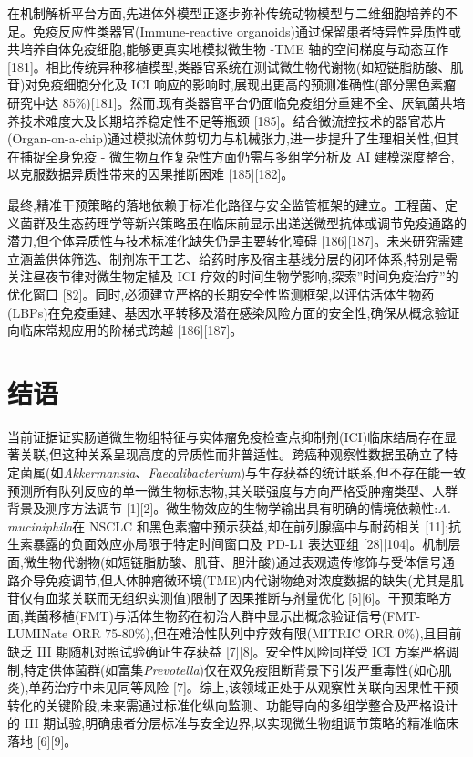 \documentclass[11pt]{article}
\begin{document}
在机制解析平台方面,先进体外模型正逐步弥补传统动物模型与二维细胞培养的不足。免疫反应性类器官(Immune-reactive organoids)通过保留患者特异性异质性或共培养自体免疫细胞,能够更真实地模拟微生物 -TME 轴的空间梯度与动态互作 {[}181{]}。相比传统异种移植模型,类器官系统在测试微生物代谢物(如短链脂肪酸、肌苷)对免疫细胞分化及 ICI 响应的影响时,展现出更高的预测准确性(部分黑色素瘤研究中达 85\%){[}181{]}。然而,现有类器官平台仍面临免疫组分重建不全、厌氧菌共培养技术难度大及长期培养稳定性不足等瓶颈 {[}185{]}。结合微流控技术的器官芯片(Organ-on-a-chip)通过模拟流体剪切力与机械张力,进一步提升了生理相关性,但其在捕捉全身免疫 - 微生物互作复杂性方面仍需与多组学分析及 AI 建模深度整合,以克服数据异质性带来的因果推断困难 {[}185{]}{[}182{]}。

最终,精准干预策略的落地依赖于标准化路径与安全监管框架的建立。工程菌、定义菌群及生态药理学等新兴策略虽在临床前显示出递送微型抗体或调节免疫通路的潜力,但个体异质性与技术标准化缺失仍是主要转化障碍 {[}186{]}{[}187{]}。未来研究需建立涵盖供体筛选、制剂冻干工艺、给药时序及宿主基线分层的闭环体系,特别是需关注昼夜节律对微生物定植及 ICI 疗效的时间生物学影响,探索''时间免疫治疗''的优化窗口 {[}82{]}。同时,必须建立严格的长期安全性监测框架,以评估活体生物药(LBPs)在免疫重建、基因水平转移及潜在感染风险方面的安全性,确保从概念验证向临床常规应用的阶梯式跨越 {[}186{]}{[}187{]}。

\section{结语}\label{ux7ed3ux8bed}

当前证据证实肠道微生物组特征与实体瘤免疫检查点抑制剂(ICI)临床结局存在显著关联,但这种关系呈现高度的异质性而非普适性。跨癌种观察性数据虽确立了特定菌属(如\emph{Akkermansia}、\emph{Faecalibacterium})与生存获益的统计联系,但不存在能一致预测所有队列反应的单一微生物标志物,其关联强度与方向严格受肿瘤类型、人群背景及测序方法调节 {[}1{]}{[}2{]}。微生物效应的生物学输出具有明确的情境依赖性:\emph{A. muciniphila}在 NSCLC 和黑色素瘤中预示获益,却在前列腺癌中与耐药相关 {[}11{]};抗生素暴露的负面效应亦局限于特定时间窗口及 PD-L1 表达亚组 {[}28{]}{[}104{]}。机制层面,微生物代谢物(如短链脂肪酸、肌苷、胆汁酸)通过表观遗传修饰与受体信号通路介导免疫调节,但人体肿瘤微环境(TME)内代谢物绝对浓度数据的缺失(尤其是肌苷仅有血浆关联而无组织实测值)限制了因果推断与剂量优化 {[}5{]}{[}6{]}。干预策略方面,粪菌移植(FMT)与活体生物药在初治人群中显示出概念验证信号(FMT-LUMINate ORR 75-80\%),但在难治性队列中疗效有限(MITRIC ORR 0\%),且目前缺乏 III 期随机对照试验确证生存获益 {[}7{]}{[}8{]}。安全性风险同样受 ICI 方案严格调制,特定供体菌群(如富集\emph{Prevotella})仅在双免疫阻断背景下引发严重毒性(如心肌炎),单药治疗中未见同等风险 {[}7{]}。综上,该领域正处于从观察性关联向因果性干预转化的关键阶段,未来需通过标准化纵向监测、功能导向的多组学整合及严格设计的 III 期试验,明确患者分层标准与安全边界,以实现微生物组调节策略的精准临床落地 {[}6{]}{[}9{]}。
\end{document}
